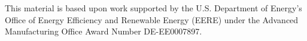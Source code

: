 This material is based upon work supported by the U.S. Department of Energy’s Office of Energy Efficiency and Renewable Energy (EERE) under the Advanced Manufacturing Office Award Number DE-EE0007897.